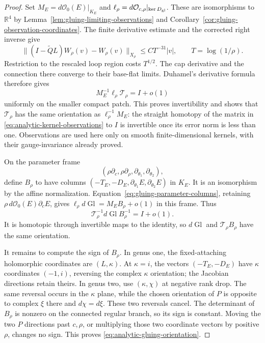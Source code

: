 \documentclass[11pt]{amsart}
\theoremstyle{definition}
\theoremstyle{remark}
\theoremstyle{plain}
\begin{document}
\begin{proof}
Set $M_E=d\mathcal O_0(E)|_{K_E}$ and
$\ell_\rho=d\mathcal O_{c,\rho}|_{\ker D_{\rm gl}}$.
These are isomorphisms to $\mathbb R^4$ by
Lemma~\ref{lem:gluing-limiting-observations} and
Corollary~\ref{cor:gluing-observation-coordinates}.
The finite derivative estimate and the corrected right inverse give
\[
 \|(I-\widetilde QL)W_\rho(v)-W_\rho(v)\|_{X_\rho}
                          \leq CT^{-31}|v|,\qquad T=\log(1/\rho).
\]
Restriction to the rescaled loop region costs $T^{1/2}$.
The cap derivative and the connection there converge to their
base-flat limits. Duhamel's derivative formula therefore gives
\begin{equation}\label{eq:analytic-kernel-observations}
                  M_E^{-1}\ell_\rho\mathcal T_\rho=I+o(1)
\end{equation}
uniformly on the smaller compact patch. This proves
invertibility and shows that $\mathcal T_\rho$ has the same
orientation as $\ell_\rho^{-1}M_E$: the straight homotopy of
the matrix in \eqref{eq:analytic-kernel-observations} to $I$
is invertible once its error norm is less than one.
Observations are used here only on smooth finite-dimensional
kernels, with their gauge-invariance already proved.

On the parameter frame
\[
 (\rho\partial_c,\rho\partial_\rho,
  \partial_{\theta_1},\partial_{\theta_2}),
\]
define $B_\rho$ to have columns
$(-T_E,-D_E,\partial_{\theta_1}E,\partial_{\theta_2}E)$
in $K_E$. It is an isomorphism by the affine normalization.
Equation~\eqref{eq:gluing-parameter-columns}, retaining
$\rho\,d\mathcal O_0(E)\partial_cE$, gives
$\ell_\rho d\operatorname{Gl}=M_EB_\rho+o(1)$
in this frame. Thus
\[
       \mathcal T_\rho^{-1}d\operatorname{Gl}B_\rho^{-1}
                                                    =I+o(1).
\]
It is homotopic through invertible maps to the identity, so
$d\operatorname{Gl}$ and $\mathcal T_\rho B_\rho$
have the same orientation.

It remains to compute the sign of $B_\rho$. In genus one,
the fixed-attaching holomorphic coordinates are $(L,\kappa)$.
At $\kappa=i$, the vectors $(-T_E,-D_E)$ have
$\kappa$ coordinates $(-1,i)$, reversing the complex
$\kappa$ orientation; the Jacobian directions retain theirs.
In genus two, use $(\kappa,\chi)$ at negative rank drop.
The same reversal occurs in the $\kappa$ plane, while
the chosen orientation of $P$ is opposite to complex
$\xi$ there and $d\chi=d\xi$. These two reversals cancel.
The determinant of $B_\rho$ is nonzero on the connected
regular branch, so its sign is constant. Moving the two
$P$ directions past $c,\rho$, or multiplying those two
coordinate vectors by positive $\rho$, changes no sign.
This proves \eqref{eq:analytic-gluing-orientation}.
\end{proof}
\end{document}
